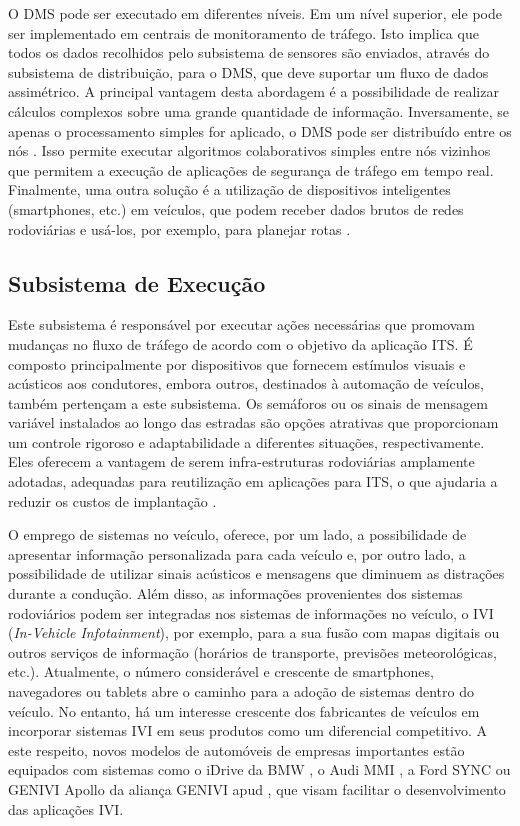 \documentclass[
	12pt,				%
	oneside,			%
	a4paper,			%
	english,			%
	brazil				%
	]{abntex2ppgsi}
\begin{document}
O DMS pode ser executado em diferentes níveis. Em um nível superior, ele pode ser implementado em centrais de monitoramento de tráfego. Isto implica que todos os dados recolhidos pelo subsistema de sensores são enviados, através do subsistema de distribuição, para o DMS, que deve suportar um fluxo de dados assimétrico. A principal vantagem desta abordagem é a possibilidade de realizar cálculos complexos sobre uma grande quantidade de informação. Inversamente, se apenas o processamento simples for aplicado, o DMS pode ser distribuído entre os nós . Isso permite executar algoritmos colaborativos simples entre nós vizinhos que permitem a execução de aplicações de segurança de tráfego em tempo real. Finalmente, uma outra solução é a utilização de dispositivos inteligentes (smartphones, etc.) em veículos, que podem receber dados brutos de redes rodoviárias e usá-los, por exemplo, para planejar rotas \cite{losilla2011comprehensive}.

\subsection{Subsistema de Execução}

Este subsistema é responsável por executar ações necessárias que promovam mudanças no fluxo de tráfego de acordo com o objetivo da aplicação ITS. É composto principalmente por dispositivos que fornecem estímulos visuais e acústicos aos condutores, embora outros, destinados à automação de veículos, também pertençam a este subsistema. Os semáforos ou os sinais de mensagem variável instalados ao longo das estradas são opções atrativas que proporcionam um controle rigoroso e adaptabilidade a diferentes situações, respectivamente. Eles oferecem a vantagem de serem infra-estruturas rodoviárias amplamente adotadas, adequadas para reutilização em aplicações para ITS, o que ajudaria a reduzir os custos de implantação \cite{losilla2011comprehensive}. 

O emprego de sistemas no veículo, oferece, por um lado, a possibilidade de apresentar informação personalizada para cada veículo e, por outro lado, a possibilidade de utilizar sinais acústicos e mensagens que diminuem as distrações durante a condução. Além disso, as informações provenientes dos sistemas rodoviários podem ser integradas nos sistemas de informações no veículo, o IVI (\textit{In-Vehicle Infotainment}), por exemplo, para a sua fusão com mapas digitais ou outros serviços de informação (horários de transporte, previsões meteorológicas, etc.). Atualmente, o número considerável e crescente de smartphones, navegadores ou tablets abre o caminho para a adoção de sistemas dentro do veículo. No entanto, há um interesse crescente dos fabricantes de veículos em incorporar sistemas IVI em seus produtos como um diferencial competitivo. A este respeito, novos modelos de automóveis de empresas importantes estão equipados com sistemas como o iDrive da BMW \cite{niedermaier2009new}, o Audi MMI , a Ford SYNC  ou GENIVI Apollo da aliança GENIVI apud  , que visam facilitar o desenvolvimento das aplicações IVI.
\end{document}
